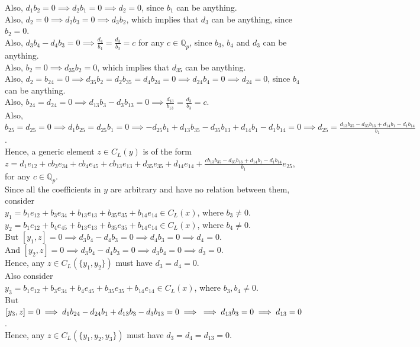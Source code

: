 \documentclass{article}
\begin{document}
Also,
$d_1b_2=0\implies{d_2b_1=0}\implies{d_2=0}$, since $b_1$ can be anything.\\
Also, $d_2=0\implies{d_2b_3=0}\implies{d_3b_2}$, which implies that $d_3$ can be anything, since $b_2=0$.\\
Also,
$d_3b_4-d_4b_3=0\implies{\frac{d_4}{b_4}=\frac{d_3}{b_3}=c}$ for any $c\in\mathbb{Q}_p$, since $b_3$, $b_4$ and $d_3$ can be anything.\\
Also,
$b_2=0\implies{d_{35}b_2=0}$, which implies that $d_{35}$ can be anything.\\
Also,
$d_2=b_{24}=0\implies{d_{35}b_2=d_2b_{35}=d_4b_{24}}=0\implies{d_{24}b_4=0}\implies{d_{24}=0}$, since $b_4$ can be anything.\\
Also,
$b_{24}=d_{24}=0\implies{d_{13}b_3-d_3b_{13}}=0\implies\frac{d_{13}}{b_{13}}=\frac{d_3}{b_3}=c$.\\
Also,
$b_{25}=d_{25}=0\implies{d_1b_{25}=d_{25}b_1=0}\implies-d_{25}b_1+d_{13}b_{35}-d_{35}b_{13}+d_{14}b_1-d_1b_{14}=0\implies{d_{25}=\frac{d_{13}b_{35}-d_{35}b_{13}+d_{14}b_1-d_1b_{14}}{b_1}}$.\\
Hence, a generic element $z\in{C}_L(y)$ is of the form\\
$z=d_1e_{12}+cb_3e_{34}+cb_4e_{45}+cb_{13}e_{13}+d_{35}e_{35}+d_{14}e_{14}+\frac{cb_{13}b_{35}-d_{35}b_{13}+d_{14}b_1-d_1b_{14}}{b_1}e_{25}$, for any $c\in\mathbb{Q}_p$.\\
Since all the coefficients in $y$ are arbitrary and have no relation between them, consider\\
$y_1=b_1e_{12}+b_3e_{34}+b_{13}e_{13}+b_{35}e_{35}+b_{14}e_{14}\in{C}_L(x)$, where $b_3\neq{0}$.\\
$y_2=b_1e_{12}+b_4e_{45}+b_{13}e_{13}+b_{35}e_{35}+b_{14}e_{14}\in{C}_L(x)$, where $b_4\neq{0}$.\\
But $[y_1,z]=0\implies{d_3b_4-d_4b_3=0}\implies{d_4b_3=0}\implies{d_4=0}$.\\
And $[y_2,z]=0\implies{d_3b_4-d_4b_3=0}\implies{d_3b_4=0}\implies{d_3=0}$.\\
Hence, any $z\in{C}_L(\{y_1,y_2\})$ must have $d_3=d_4=0$.\\
Also consider\\
$y_3=b_1e_{12}+b_3e_{34}+b_4e_{45}+b_{35}e_{35}+b_{14}e_{14}\in{C}_L(x)$, where $b_3,b_4\neq{0}$.\\
But $[y_3,z]=0\implies{d_1b_{24}-d_{24}b_1+d_{13}b_3-d_3b_{13}}=0\implies\\\implies{d_{13}b_3=0}\implies{d_{13}=0}$.\\
Hence, any $z\in{C}_L(\{y_1,y_2,y_3\})$ must have $d_3=d_4=d_{13}=0$.\\
\end{document}
